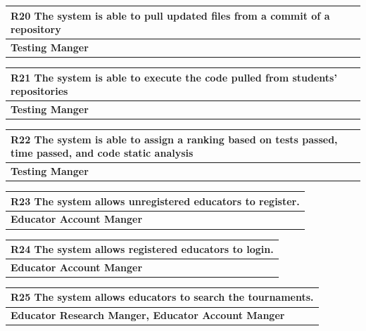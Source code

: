 \documentclass[12pt, a4paper]{report}
\begin{document}
\begin{table}[H]
    \begin{tabularx}{\textwidth}{X}
    \textbf{R20} The system is able to pull updated files from a commit of a repository\\
    \hline 
    \textbf{Testing Manger}
\end{tabularx}
\end{table}

\begin{table}[H]
    \begin{tabularx}{\textwidth}{X}
    \textbf{R21} The system is able to execute the code pulled from students' repositories\\
    \hline 
    \textbf{Testing Manger}
\end{tabularx}
\end{table}

\begin{table}[H]
    \begin{tabularx}{\textwidth}{X}
    \textbf{R22} The system is able to assign a ranking based on tests passed, time passed, and code static analysis\\
    \hline 
    \textbf{Testing Manger}
\end{tabularx}
\end{table}

\begin{table}[H]
    \begin{tabularx}{\textwidth}{X}
    \textbf{R23} The system allows unregistered educators to register.\\
    \hline 
    \textbf{Educator Account Manger}
\end{tabularx}
\end{table}

\begin{table}[H]
    \begin{tabularx}{\textwidth}{X}
    \textbf{R24} The system allows registered educators to login.\\
    \hline 
    \textbf{Educator Account Manger}
\end{tabularx}
\end{table}

\begin{table}[H]
    \begin{tabularx}{\textwidth}{X}
    \textbf{R25} The system allows educators to search the tournaments.\\
    \hline 
    \textbf{Educator Research Manger, Educator Account Manger}
\end{tabularx}
\end{table}
\end{document}
